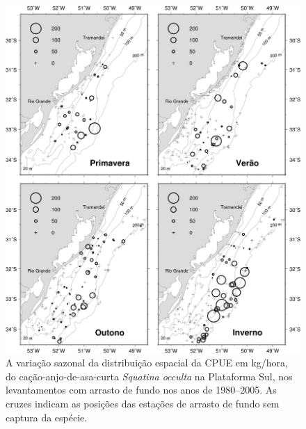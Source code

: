 \documentclass[a4paper,11pt,twoside,showtrims,onecolumn,openright,final]{memoir}
\begin{document}
\begin{figure}
\begin{center}
\includegraphics[width=\textwidth]{Occulta_mapa_Distribuicao_CPUE}
\end{center}
\caption[Variação sazonal da distribuição espacial da CPUE em kg/hora, do cação-anjo-de-asa-curta \emph{Squatina occulta}]
	{A variação sazonal da distribuição espacial da CPUE em kg/hora, do cação-anjo-de-asa-curta \emph{Squatina occulta} 
	 na Plataforma Sul, nos levantamentos com arrasto de fundo nos anos de 1980--2005. 
	 As cruzes indicam as posições das estações de arrasto de fundo sem captura da espécie.}
\label{fig:occulta-mapacpue}
\end{figure}

	  
\end{document}
